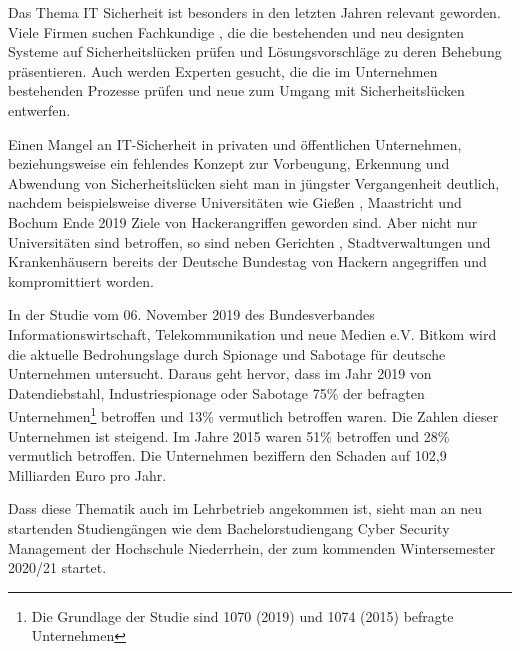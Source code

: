 \label{chap_text:Einleitung}
Das Thema IT Sicherheit ist besonders in den letzten Jahren relevant geworden. Viele Firmen suchen Fachkundige \cite{it-daily.netITSecurityExpertenWerdenHanderingend2019}, die die bestehenden und neu designten Systeme auf Sicherheitslücken prüfen und Lösungsvorschläge zu deren Behebung präsentieren. Auch werden Experten gesucht, die die im Unternehmen bestehenden Prozesse prüfen und neue zum Umgang mit Sicherheitslücken entwerfen.

Einen Mangel an IT-Sicherheit in privaten und öffentlichen Unternehmen, beziehungsweise ein fehlendes Konzept zur Vorbeugung, Erkennung und Abwendung von Sicherheitslücken sieht man in jüngster Vergangenheit deutlich, nachdem beispielsweise diverse Universitäten wie Gießen \cite{schirmacherUniGiessenNaehert2020}, Maastricht \cite{wdrCyberattackeHackerangriffAuf2019} und Bochum \cite{ruhr24HackerAngriffLegtITSysteme2020} Ende 2019 Ziele von Hackerangriffen geworden sind. Aber nicht nur Universitäten sind betroffen, so sind neben Gerichten \cite{hurtzHackerAngriffAufGericht2020}, Stadtverwaltungen \cite{barsigCyberAttackeAufPotsdamer2020} und Krankenhäusern \cite{wellbrockITSicherheitImKrankenhaus2019} bereits der Deutsche Bundestag von Hackern angegriffen und kompromittiert worden. \cite{fladeCyberangriffAufBundestag2020}

In der Studie  vom 06. November 2019 des Bundesverbandes Informationswirtschaft, Telekommunikation und neue Medien e.V. Bitkom wird die aktuelle Bedrohungslage durch Spionage und Sabotage für deutsche Unternehmen untersucht. Daraus geht hervor, dass im Jahr 2019 von Datendiebstahl, Industriespionage oder Sabotage 75\% der befragten Unternehmen\footnote{Die Grundlage der Studie sind 1070 (2019) und 1074 (2015) befragte Unternehmen} betroffen  und 13\% vermutlich betroffen waren. Die Zahlen dieser Unternehmen ist steigend. Im Jahre 2015 waren  51\% betroffen und 28\% vermutlich betroffen. Die Unternehmen beziffern den Schaden auf 102,9 Milliarden Euro pro Jahr. \cite{bergWirtschaftsschutzDigitalenWelt2019}

Dass diese Thematik auch im Lehrbetrieb angekommen ist, sieht man an neu startenden Studiengängen wie dem Bachelorstudiengang Cyber Security Management der Hochschule Niederrhein, der zum kommenden Wintersemester 2020/21 startet. \cite{hochschuleniederrheinHackernRoteKarte2020}

